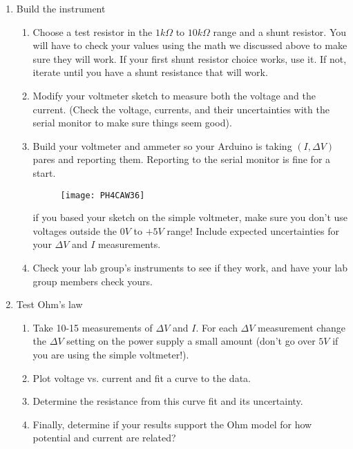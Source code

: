 \begin{enumerate}
\item Build the instrument

\begin{enumerate}
\item Choose a test resistor in the $1\unit{k\Omega}$ to $10\unit{k\Omega}$ range and a shunt resistor. You will have to check your values using the math we discussed above to make sure they will work. If your first shunt resistor choice works, use it. If not, iterate until you have a shunt resistance that will work.

	\item Modify your voltmeter sketch to measure both the voltage and the current. (Check the voltage, currents, and their uncertainties with the serial monitor to make sure things seem good).

	\item Build your voltmeter and ammeter so your Arduino is taking $\left(I,\Delta V\right) $ pares and reporting them. Reporting to the serial monitor is fine for a start. 
	\begin{figure}[h!]
		\centering
		\texttt{[image: PH4CAW36]}
	\end{figure}
	\noindent if you based your sketch on the simple voltmeter, make sure you don't use voltages outside the $0\unit{V}$ to $+5\unit{V}$ range! Include expected uncertainties for your $\Delta V$ and $I$ measurements.

	\item Check your lab group's instruments to see if they work, and have your lab group members check yours.
\end{enumerate}

\item Test Ohm's law

\begin{enumerate}
	\item Take 10-15 measurements of $\Delta V$ and $I.$ For each $\Delta V$ measurement change the $\Delta V$ setting on the power supply a small amount (don't go over $5\unit{V}$ if you are using the simple voltmeter!).
	
	\item Plot voltage vs. current and fit a curve to the data.

	\item Determine the resistance from this curve fit and its uncertainty.

	\item Finally, determine if your results support the Ohm model for how potential and current are related?


\end{enumerate}
\end{enumerate}
